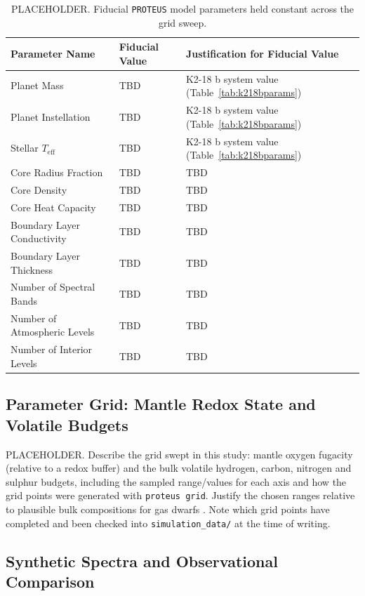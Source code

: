 \documentclass[fleqn,usenatbib]{mnras}
\begin{document}
\begin{table}
\centering
\renewcommand{\arraystretch}{1.2}
\begin{tabular}{|p{7cm}|p{2cm}|p{8cm}|}
\hline
Parameter Name & Fiducial Value & Justification for Fiducial Value \\
\hline
Planet Mass & TBD & K2-18 b system value (Table~\ref{tab:k218bparams}) \\
Planet Instellation & TBD & K2-18 b system value (Table~\ref{tab:k218bparams}) \\
Stellar $T_{\text{eff}}$ & TBD & K2-18 b system value (Table~\ref{tab:k218bparams}) \\
Core Radius Fraction & TBD & TBD \\
Core Density & TBD & TBD \\
Core Heat Capacity & TBD & TBD \\
Boundary Layer Conductivity & TBD & TBD \\
Boundary Layer Thickness & TBD & TBD \\
Number of Spectral Bands & TBD & TBD \\
Number of Atmospheric Levels & TBD & TBD \\
Number of Interior Levels & TBD & TBD \\
\hline
\end{tabular}
\caption{PLACEHOLDER. Fiducial \texttt{PROTEUS} model parameters held
constant across the grid sweep.}
\label{tab:constantparameters}
\end{table}

\subsection{Parameter Grid: Mantle Redox State and Volatile Budgets}
\label{subsec:parametergrid}

PLACEHOLDER. Describe the grid swept in this study: mantle oxygen fugacity
(relative to a redox buffer) and the bulk volatile hydrogen, carbon, nitrogen
and sulphur budgets, including the sampled range/values for each axis and how
the grid points were generated with \texttt{proteus grid}. Justify the
chosen ranges relative to plausible bulk compositions for gas dwarfs
\citep{Wolfgang2015,Ginzburg2016,Tang2024}. Note which grid points have
completed and been checked into \texttt{simulation\_data/} at the time of
writing.

\subsection{Synthetic Spectra and Observational Comparison}
\label{subsec:spectracomparison}
\end{document}
